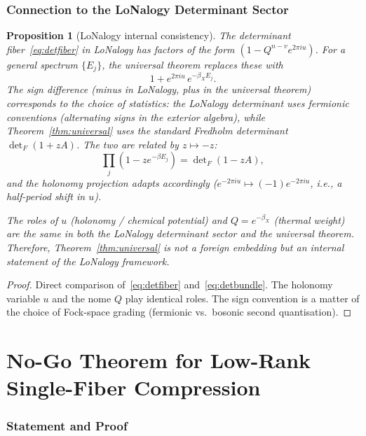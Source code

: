 \documentclass[12pt]{article}
\theoremstyle{plain}
\newtheorem{proposition}[theorem]{Proposition}
\theoremstyle{definition}
\numberwithin{equation}{section}
\begin{document}
\section{Connection to the LoNalogy Determinant Sector}\label{sec:connection}

\begin{proposition}[LoNalogy internal consistency]\label{prop:internal}
The determinant fiber~\eqref{eq:detfiber} in LoNalogy has factors of the
form $(1-Q^{n-v}e^{2\pi iu})$.  For a general spectrum $\{E_j\}$, the
universal theorem replaces these with
\begin{equation}
1+e^{2\pi iu}\,e^{-\beta_X E_j}.
\end{equation}
The sign difference (minus in LoNalogy, plus in the universal theorem)
corresponds to the choice of statistics: the LoNalogy determinant uses
fermionic conventions (alternating signs in the exterior algebra), while
Theorem~\ref{thm:universal} uses the standard Fredholm determinant
$\det_F(1+zA)$.  The two are related by $z\mapsto -z$:
\begin{equation}
\prod_j(1-ze^{-\beta E_j}) = \det\nolimits_F(1-zA),
\end{equation}
and the holonomy projection adapts accordingly
($e^{-2\pi iu}\mapsto(-1)e^{-2\pi iu}$, i.e., a half-period shift in $u$).

The roles of $u$ (holonomy / chemical potential) and
$Q=e^{-\beta_X}$ (thermal weight) are the same in both the LoNalogy
determinant sector and the universal theorem.  Therefore,
Theorem~\ref{thm:universal} is not a foreign embedding but an
\emph{internal statement} of the LoNalogy framework.
\end{proposition}

\begin{proof}
Direct comparison of~\eqref{eq:detfiber} and~\eqref{eq:detbundle}.
The holonomy variable $u$ and the nome $Q$ play identical roles.
The sign convention is a matter of the choice of Fock-space grading
(fermionic vs.\ bosonic second quantisation).
\end{proof}


\part{No-Go Theorem for Low-Rank Single-Fiber Compression}

\section{Statement and Proof}\label{sec:nogo}
\end{document}

